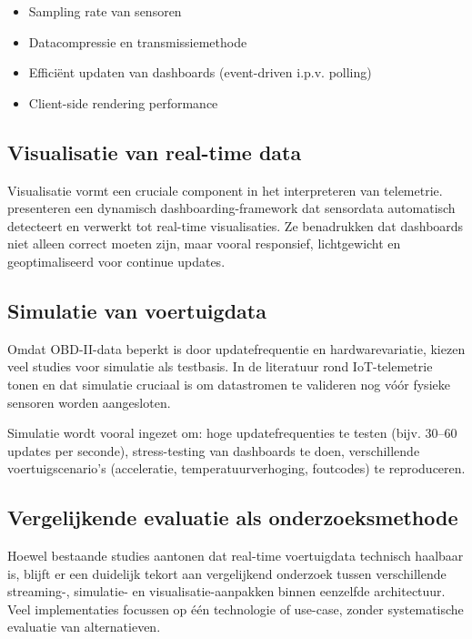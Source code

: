 \begin{itemize}
    \item Sampling rate van sensoren
    \item Datacompressie en transmissiemethode
    \item Efficiënt updaten van dashboards (event-driven i.p.v. polling)
    \item Client-side rendering performance
\end{itemize}

\subsection{Visualisatie van real-time data}

Visualisatie vormt een cruciale component in het interpreteren van telemetrie. \textcite{VandenHautte2020} presenteren een dynamisch dashboarding-framework dat sensordata automatisch detecteert en verwerkt tot real-time visualisaties. Ze benadrukken dat dashboards niet alleen correct moeten zijn, maar vooral responsief, lichtgewicht en geoptimaliseerd voor continue updates.

\subsection{Simulatie van voertuigdata}

Omdat OBD-II-data beperkt is door updatefrequentie en hardwarevariatie, kiezen veel studies voor simulatie als testbasis. In de literatuur rond IoT-telemetrie tonen \textcite{Perez-Gonzalez2025} en \textcite{Madushan2023} dat simulatie cruciaal is om datastromen te valideren nog vóór fysieke sensoren worden aangesloten.

Simulatie wordt vooral ingezet om:
hoge updatefrequenties te testen (bijv. 30–60 updates per seconde),
stress-testing van dashboards te doen,
verschillende voertuigscenario’s (acceleratie, temperatuurverhoging, foutcodes) te reproduceren.

\subsection{Vergelijkende evaluatie als onderzoeksmethode}

Hoewel bestaande studies aantonen dat real-time voertuigdata technisch haalbaar is, blijft er een duidelijk tekort aan vergelijkend onderzoek tussen verschillende streaming-, simulatie- en visualisatie-aanpakken binnen eenzelfde architectuur. Veel implementaties focussen op één technologie of use-case, zonder systematische evaluatie van alternatieven.

